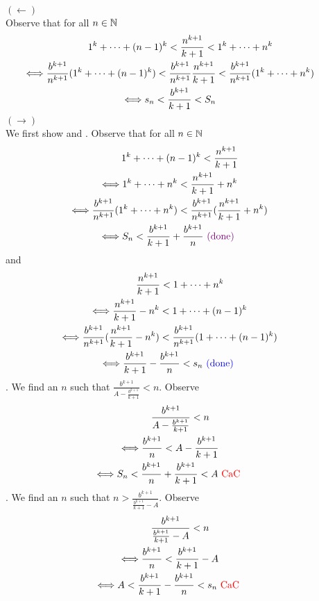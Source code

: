 \documentclass{report}
\begin{document}
\\
\begin{solution}
  $(\longleftarrow)$\\
  
  
Observe that for all $n\in\mathbb{N}$
\begin{gather}
1^k+\cdots +(n-1)^k<\frac{n^{k+1}}{k+1}<1^k+\cdots +n^k\\
\liff \frac{b^{k+1}}{n^{k+1}}(1^k+\cdots +(n-1)^k)<\frac{b^{k+1}}{n^{k+1}}\frac{n^{k+1}}{k+1}<\frac{b^{k+1}}{n^{k+1}}(1^k+\cdots +n^{k})\\
\liff s_n<\frac{b^{k+1}}{k+1}<S_n 
\end{gather}
$(\longrightarrow)$\\

We first show  and . Observe that for all $n\in\mathbb{N}$
\begin{gather}
1^k+\cdots +(n-1)^k<\frac{n^{k+1}}{k+1}\\
\liff 1^k+\cdots +n^k<\frac{n^{k+1}}{k+1}+n^k\\
\liff \frac{b^{k+1}}{n^{k+1}}(1^k+\cdots +n^k)<\frac{b^{k+1}}{n^{k+1}}(\frac{n^{k+1}}{k+1}+n^k)\\
\liff S_n< \frac{b^{k+1}}{k+1}+\frac{b^{k+1}}{n} \vdone 
\end{gather}
and
\begin{gather}
\frac{n^{k+1}}{k+1}<1+\cdots +n^k\\
\liff \frac{n^{k+1}}{k+1}-n^{k}<1+\cdots +(n-1)^k\\
\liff \frac{b^{k+1}}{n^{k+1}}(\frac{n^{k+1}}{k+1}-n^k)<\frac{b^{k+1}}{n^{k+1}}(1+\cdots +(n-1)^k)\\
\liff \frac{b^{k+1}}{k+1}-\frac{b^{k+1}}{n}<s_n \bdone
\end{gather}
. We find an $n$ such that $\frac{b^{k+1}}{A-\frac{b^{k+1}}{k+1}}<n$. Observe
\begin{gather}
\frac{b^{k+1}}{A-\frac{b^{k+1}}{k+1}}<n\\
\liff \frac{b^{k+1}}{n}<A-\frac{b^{k+1}}{k+1}\\
\liff S_n<\frac{b^{k+1}}{n}+\frac{b^{k+1}}{k+1}<A \text{ \CaC }
\end{gather}
. We find an $n$ such that $n>\frac{b^{k+1}}{\frac{b^{k+1}}{k+1}-A}$. Observe
\begin{gather}
\frac{b^{k+1}}{\frac{b^{k+1}}{k+1}-A}<n\\
\liff \frac{b^{k+1}}{n}<\frac{b^{k+1}}{k+1}-A\\
\liff A<\frac{b^{k+1}}{k+1}-\frac{b^{k+1}}{n}<s_n \tCaC 
\end{gather}
\end{solution}
\end{document}
